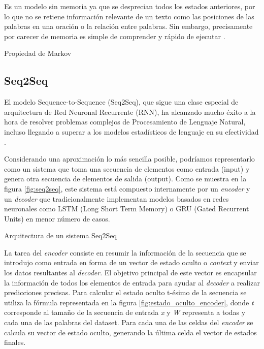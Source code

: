 Es un modelo sin memoria ya que se desprecian todos los estados anteriores, por lo que no se retiene información relevante de un texto como las posiciones de las palabras en una oración o la relación entre palabras. Sin embargo, precisamente por carecer de memoria es simple de comprender y rápido de ejecutar \citep{fumagalli_2020}.

%
{Propiedad de Markov}



\subsection{Seq2Seq}
El modelo Sequence-to-Sequence (Seq2Seq), que sigue una clase especial de arquitectura de Red Neuronal Recurrente (RNN), ha alcanzado mucho éxito a la hora de resolver problemas complejos de Procesamiento de Lenguaje Natural, incluso llegando a superar a los modelos estadísticos de lenguaje en su efectividad \citep{analytics_vidhya_2020}.

Considerando una aproximación lo más sencilla posible, podríamos representarlo como un sistema que toma una secuencia de elementos como entrada (input) y genera otra secuencia de elementos de salida (output). Como se muestra en la figura \ref{fig:seq2seq}, este sistema está compuesto internamente por un \textit{encoder} y un \textit{decoder} que tradicionalmente implementan modelos basados en redes neuronales como LSTM (Long Short Term Memory) o GRU (Gated Recurrent Units) en menor número de casos. 

%
{Arquitectura de un sistema Seq2Seq}

La tarea del \textit{encoder} consiste en resumir la información de la secuencia que se introdujo como entrada en forma de un vector de estado oculto o \textit{context} y enviar los datos resultantes al \textit{decoder}. El objetivo principal de este vector es encapsular la información de todos los elementos de entrada para ayudar al \textit{decoder} a realizar predicciones precisas. Para calcular el estado oculto t-ésimo de la secuencia se utiliza la fórmula representada en la figura \ref{fig:estado_oculto_encoder}, donde \textit{t} corresponde al tamaño de la secuencia de entrada \textit{x} y \textit{W} representa a todas y cada una de las palabras del dataset. Para cada una de las celdas del \textit{encoder} se calcula su vector de estado oculto, generando la última celda el vector de estados finales.

